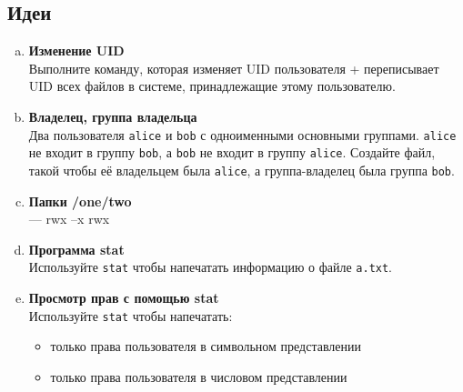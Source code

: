 \documentclass{article}
\begin{document}
\subsection*{Идеи}
\begin{enumerate}[a.]

\item \textbf{Изменение UID}\\
Выполните команду, которая изменяет UID пользователя + переписывает UID всех файлов в системе, принадлежащие этому пользователю. 

\item \textbf{Владелец, группа владельца}\\
Два пользователя \texttt{alice} и \texttt{bob} с одноименными основными группами. \texttt{alice} не входит в группу \texttt{bob}, а \texttt{bob} не входит в группу \texttt{alice}. Создайте файл, такой чтобы её владельцем была \texttt{alice}, а группа-владелец была группа \texttt{bob}.

\item \textbf{Папки /one/two}\\
--- rwx
--x rwx

\item \textbf{Программа stat}\\
Используйте \texttt{stat} чтобы напечатать информацию о файле \texttt{a.txt}.

\item \textbf{Просмотр прав с помощью stat}\\
Используйте \texttt{stat} чтобы напечатать: 
\begin{itemize}
\item только права пользователя в символьном представлении
\item только права пользователя в числовом представлении
\end{itemize}
\end{enumerate}
\fi
\end{document}
